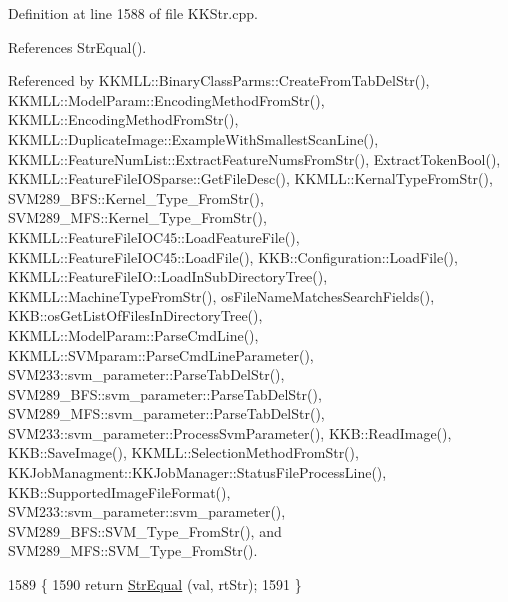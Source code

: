 Definition at line 1588 of file K\+K\+Str.\+cpp.



References Str\+Equal().



Referenced by K\+K\+M\+L\+L\+::\+Binary\+Class\+Parms\+::\+Create\+From\+Tab\+Del\+Str(), K\+K\+M\+L\+L\+::\+Model\+Param\+::\+Encoding\+Method\+From\+Str(), K\+K\+M\+L\+L\+::\+Encoding\+Method\+From\+Str(), K\+K\+M\+L\+L\+::\+Duplicate\+Image\+::\+Example\+With\+Smallest\+Scan\+Line(), K\+K\+M\+L\+L\+::\+Feature\+Num\+List\+::\+Extract\+Feature\+Nums\+From\+Str(), Extract\+Token\+Bool(), K\+K\+M\+L\+L\+::\+Feature\+File\+I\+O\+Sparse\+::\+Get\+File\+Desc(), K\+K\+M\+L\+L\+::\+Kernal\+Type\+From\+Str(), S\+V\+M289\+\_\+\+B\+F\+S\+::\+Kernel\+\_\+\+Type\+\_\+\+From\+Str(), S\+V\+M289\+\_\+\+M\+F\+S\+::\+Kernel\+\_\+\+Type\+\_\+\+From\+Str(), K\+K\+M\+L\+L\+::\+Feature\+File\+I\+O\+C45\+::\+Load\+Feature\+File(), K\+K\+M\+L\+L\+::\+Feature\+File\+I\+O\+C45\+::\+Load\+File(), K\+K\+B\+::\+Configuration\+::\+Load\+File(), K\+K\+M\+L\+L\+::\+Feature\+File\+I\+O\+::\+Load\+In\+Sub\+Directory\+Tree(), K\+K\+M\+L\+L\+::\+Machine\+Type\+From\+Str(), os\+File\+Name\+Matches\+Search\+Fields(), K\+K\+B\+::os\+Get\+List\+Of\+Files\+In\+Directory\+Tree(), K\+K\+M\+L\+L\+::\+Model\+Param\+::\+Parse\+Cmd\+Line(), K\+K\+M\+L\+L\+::\+S\+V\+Mparam\+::\+Parse\+Cmd\+Line\+Parameter(), S\+V\+M233\+::svm\+\_\+parameter\+::\+Parse\+Tab\+Del\+Str(), S\+V\+M289\+\_\+\+B\+F\+S\+::svm\+\_\+parameter\+::\+Parse\+Tab\+Del\+Str(), S\+V\+M289\+\_\+\+M\+F\+S\+::svm\+\_\+parameter\+::\+Parse\+Tab\+Del\+Str(), S\+V\+M233\+::svm\+\_\+parameter\+::\+Process\+Svm\+Parameter(), K\+K\+B\+::\+Read\+Image(), K\+K\+B\+::\+Save\+Image(), K\+K\+M\+L\+L\+::\+Selection\+Method\+From\+Str(), K\+K\+Job\+Managment\+::\+K\+K\+Job\+Manager\+::\+Status\+File\+Process\+Line(), K\+K\+B\+::\+Supported\+Image\+File\+Format(), S\+V\+M233\+::svm\+\_\+parameter\+::svm\+\_\+parameter(), S\+V\+M289\+\_\+\+B\+F\+S\+::\+S\+V\+M\+\_\+\+Type\+\_\+\+From\+Str(), and S\+V\+M289\+\_\+\+M\+F\+S\+::\+S\+V\+M\+\_\+\+Type\+\_\+\+From\+Str().


\begin{DoxyCode}
1589 \{
1590   \textcolor{keywordflow}{return}  \hyperlink{class_k_k_b_1_1_k_k_str_a936d949d33ff2608f8331bb286e40b62}{StrEqual} (val, rtStr);
1591 \}
\end{DoxyCode}
